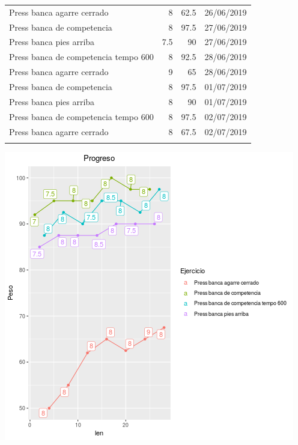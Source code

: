 \documentclass[11pt]{article}
\begin{document}
\begin{center}
\begin{tabular}{lrrl}
Press banca agarre cerrado & 8 & 62.5 & 26/06/2019\\
Press banca de competencia & 8 & 97.5 & 27/06/2019\\
Press banca pies arriba & 7.5 & 90 & 27/06/2019\\
Press banca de competencia tempo 600 & 8 & 92.5 & 28/06/2019\\
Press banca agarre cerrado & 9 & 65 & 28/06/2019\\
Press banca de competencia & 8 & 97.5 & 01/07/2019\\
Press banca pies arriba & 8 & 90 & 01/07/2019\\
Press banca de competencia tempo 600 & 8 & 97.5 & 02/07/2019\\
Press banca agarre cerrado & 8 & 67.5 & 02/07/2019\\
 &  &  & \\
\end{tabular}
\end{center}
\begin{center}
\includegraphics[width=.9\linewidth]{tmp.png}
\end{center}
\end{document}
